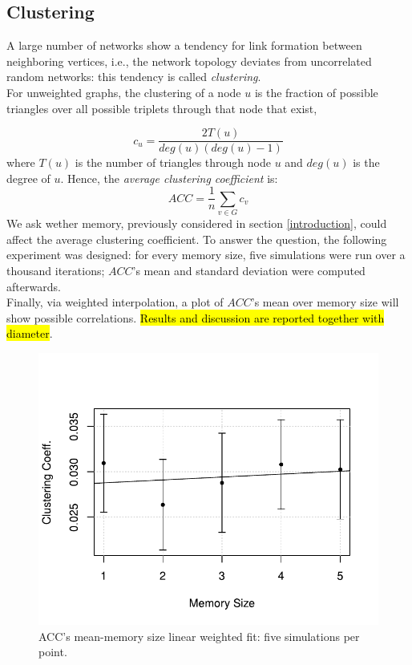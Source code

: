 \subsection{Clustering} \label{clustering}
A large number of networks show a tendency for link formation
between neighboring vertices, i.e., the network topology deviates
from uncorrelated random networks: this tendency is called
\textit{clustering}.\cite{clusterarticle}\\
For unweighted graphs, the clustering of a node $u$ is the fraction
of possible triangles over all possible triplets
through that node that exist,\cite{clustersite}

\begin{equation}
\label{eq:clustering}
c_u = \frac{2 T(u)}{deg(u)(deg(u)-1)}
\end{equation}
where $T(u)$ is the number of triangles through node $u$ and $deg(u)$ is the degree of $u$.
Hence, the \textit{average clustering coefficient}  is:
\begin{equation}
\label{eq:averageclustering}
ACC = \frac{1}{n}\sum_{v \in G} c_v
\end{equation}
We ask wether memory, previously considered in section
\ref{introduction}, could affect the average clustering coefficient.
To answer the question, the following experiment was designed:
for every memory size, five simulations were run over a thousand
iterations; $ACC$'s mean and standard deviation were computed
afterwards.\\
Finally, via weighted interpolation, a plot of $ACC$'s mean
over memory size will show possible  correlations.
\hl{Results and discussion are reported together with diameter}.
\begin{figure}[h]
  \centering
  \includegraphics[trim={0cm 0cm 0cm 1cm},clip,width=.8\columnwidth]{img/clustering.pdf}
  \caption{ACC's mean-memory size linear weighted fit: five simulations per point.\label{fig:clustering}}
\end{figure}
